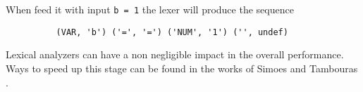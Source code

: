 
When feed it with input \verb|b = 1| the lexer
will produce the sequence 

\begin{verbatim}
          (VAR, 'b') ('=', '=') ('NUM', '1') ('', undef)
\end{verbatim}

Lexical analyzers can have a non negligible impact in 
the overall performance. Ways to speed up this stage can be found 
in the works of Simoes \cite{simoes} and Tambouras \cite{Tambouras}.
